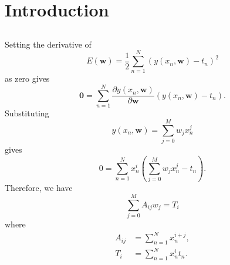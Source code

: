 \section{Introduction}

\subsection{}
Setting the derivative of 
%
\begin{equation}
E(\textbf{w}) = \frac{1}{2} \sum_{n = 1}^{N} \left( y(x_n, \textbf{w}) - t_n \right) ^ 2
\end{equation}
%
as zero gives
%
\begin{equation}
\textbf{0} = \sum_{n = 1}^{N} \frac{\partial y(x_n, \textbf{w})}{\partial \textbf{w}} \left( y(x_n, \textbf{w}) - t_n \right).
\end{equation}
%
Substituting 
%
\begin{equation}
y(x_n, \textbf{w}) = \sum_{j = 0}^{M} w_j x_n^j
\end{equation}
%
gives
%
\begin{equation}
0 = \sum_{n = 1}^{N} x_n^i \left( \sum_{j = 0}^{M} w_j x_n^j - t_n \right).
\end{equation}
%
Therefore, we have 
%
\begin{equation}
\sum_{j = 0}^{M} A_{ij} w_j = T_i
\end{equation}
%
where
%
\begin{equation}
\begin{align}
A_{ij} &= \sum_{n = 1}^{N} x_n^{i + j}, \\
T_i &= \sum_{n = 1}^{N} x_n^i t_n.
\end{align}
\end{equation}